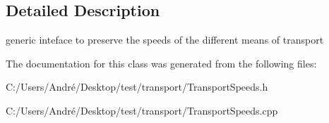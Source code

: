 \subsection{Detailed Description}
generic inteface to preserve the speeds of the different means of transport 

The documentation for this class was generated from the following files\+:\begin{DoxyCompactItemize}
\item 
C\+:/\+Users/\+André/\+Desktop/test/transport/Transport\+Speeds.\+h\item 
C\+:/\+Users/\+André/\+Desktop/test/transport/Transport\+Speeds.\+cpp\end{DoxyCompactItemize}
